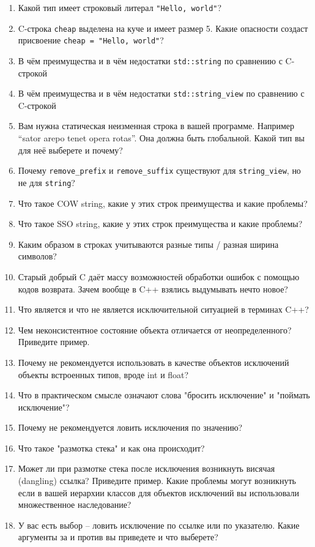 \documentclass[a4paper,12pt,oneside]{article}
\begin{document}
\begin{enumerate}
\item Какой тип имеет строковый литерал \lstinline!"Hello, world"!?
\item C-строка \lstinline!cheap! выделена на куче и имеет размер 5. Какие опасности создаст присвоение \lstinline!cheap = "Hello, world"!?
\item В чём преимущества и в чём недостатки \lstinline!std::string! по сравнению с C-строкой
\item В чём преимущества и в чём недостатки \lstinline!std::string_view! по сравнению с C-строкой
\item Вам нужна статическая неизменная строка в вашей программе. Например ``sator arepo tenet opera rotas''. Она должна быть глобальной. Какой тип вы для неё выберете и почему?
\item Почему \lstinline!remove_prefix! и \lstinline!remove_suffix! существуют для \lstinline!string_view!, но не для \lstinline!string!?
\item Что такое COW string, какие у этих строк преимущества и какие проблемы?
\item Что такое SSO string, какие у этих строк преимущества и какие проблемы?
\item Каким образом в строках учитываются разные типы / разная ширина символов?
\item Старый добрый C даёт массу возможностей обработки ошибок с помощью кодов возврата. Зачем вообще в C++ взялись выдумывать нечто новое?
\item Что является и что не является исключительной ситуацией в терминах C++?
\item Чем неконсистентное состояние объекта отличается от неопределенного? Приведите пример.
\item Почему не рекомендуется использовать в качестве объектов исключений объекты встроенных типов, вроде int и float?
\item Что в практическом смысле означают слова "бросить исключение" и "поймать исключение"?
\item Почему не рекомендуется ловить исключения по значению?
\item Что такое "размотка стека" и как она происходит?
\item Может ли при размотке стека после исключения возникнуть висячая (dangling) ссылка? Приведите пример.
Какие проблемы могут возникнуть если в вашей иерархии классов для объектов исключений вы использовали множественное наследование?
\item У вас есть выбор -- ловить исключение по ссылке или по указателю. Какие аргументы за и против вы приведете и что выберете?

\end{enumerate}
\end{document}
